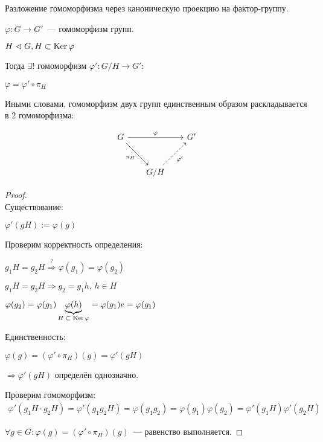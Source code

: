 \begin{theorem-non}
    Разложение гомоморфизма через каноническую проекцию на фактор-группу.

    $\varphi: G \to G'$~--- гомоморфизм групп.

    $H \vartriangleleft G, H \subset \operatorname{Ker} \varphi$

    Тогда $\exists !$ гомоморфизм $\varphi': G/H \to G':$

    $\varphi = \varphi' \circ \pi_{H}$

    Иными словами, гомоморфизм двух групп единственным образом раскладывается в 2 гомоморфизма:


    \[
    \begin{tikzcd}[row sep=large, column sep=scriptsize]
        G \arrow{rr}{\varphi} \arrow[swap]{rd}{\pi_H} & & G' \\
            & G/H \arrow[swap,dashed]{ru}{\varphi'} & 
    \end{tikzcd}
    \]


    \begin{proof}
        $ $ \\
        Существование:

        $\varphi'(gH) := \varphi(g)$

        Проверим корректность определения:

        $g_1H = g_2H \stackrel{?}{\Longrightarrow} \varphi(g_1) = \varphi(g_2)$
        
        $g_1H = g_2H \Longrightarrow g_2 = g_1h,\, h \in H$

        $\varphi(g_2) = \varphi(g_1)\underbrace{\varphi(h)}_{\text{$H \subset \operatorname{Ker} \varphi$}} = \varphi(g_1)e = \varphi(g_1)$

        Единственность:

        $\varphi(g) = (\varphi' \circ \pi_{H})(g) = \varphi'(gH)$

        $\Longrightarrow \varphi'(gH)$ определён однозначно.

        Проверим гомоморфизм:
        \begin{gather*}
            \varphi'(g_1H \cdot g_2H) = \varphi'(g_1g_2H) = \varphi(g_1g_2) = \varphi(g_1)\varphi(g_2) = \varphi'(g_1H)\varphi'(g_2H)    
        \end{gather*}
        
        $\forall g \in G: \varphi(g) = (\varphi' \circ \pi_{H})(g)$~--- равенство выполняется.
    \end{proof}
\end{theorem-non}

